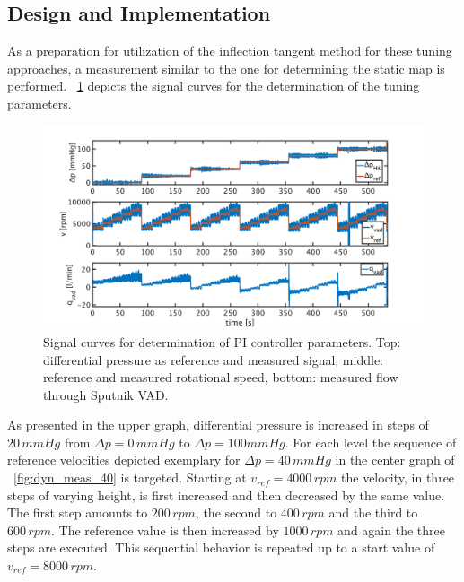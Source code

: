 \subsection{Design and Implementation}
As a preparation for utilization of the inflection tangent method for these tuning approaches, a measurement similar to the one for determining the static map is performed. \figurename~\ref{fig:dyn_meas} depicts the signal curves for the determination of the tuning parameters.
\begin{figure}[ht]
  \centering
  \includegraphics[width=\textwidth]{images/chapt_5/dyn_measure.pdf}
  \caption[Signal curves for determination of PI controller parameters]{Signal curves for determination of PI controller parameters. Top: differential pressure as reference and measured signal, middle: reference and measured rotational speed, bottom: measured flow through Sputnik VAD.}
  \label{fig:dyn_meas}
\end{figure}
As presented in the upper graph, differential pressure is increased in steps of $20\,mmHg$ from $\Delta{p}=0\,mmHg$ to $\Delta{p}=100mmHg$. For each level the sequence of reference velocities depicted exemplary for $\Delta{p}=40\,mmHg$ in the center graph of \figurename~\ref{fig:dyn_meas_40} is targeted. Starting at $v_{ref}=4000 \, rpm $ the velocity, in three steps of varying height, is first increased and then decreased by the same value. The first step amounts to $200 \, rpm$, the second to $400\,rpm$ and the third to $600 \, rpm$. The reference value is then increased by $1000\,rpm$ and again the three steps are executed. This sequential behavior is repeated up to a start value of $v_{ref}=8000\,rpm$.
